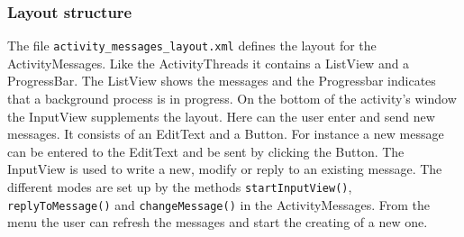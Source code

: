 \documentclass[12pt,a4paper,oneside]{report}
\newcommand{\code}[1]{\lstinline{#1}}
\begin{document}
\subsubsection{Layout structure}
The file \code{activity_messages_layout.xml} defines the layout for the ActivityMessages. Like the ActivityThreads it contains a ListView and a ProgressBar. The ListView shows the messages and the Progressbar indicates that a background process is in progress. On the bottom of the activity's window the InputView supplements the layout. Here can the user enter and send new messages. It consists of an EditText and a Button. For instance a new message can be entered to the EditText and be sent by clicking the Button. 
The InputView is used to write a new, modify or reply to an existing message. The different modes are set up by the methods \code{startInputView()}, \code{ replyToMessage()} and \code{changeMessage()} in the ActivityMessages.
From the menu the user can refresh the messages and start the creating of a new one. \\
\end{document}
